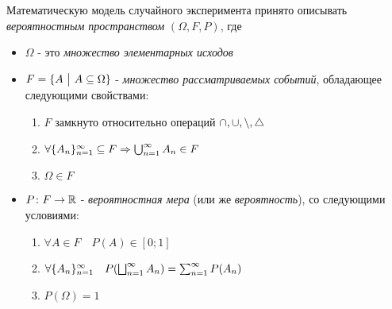 \begin{definition}
	Математическую модель случайного эксперимента принято описывать \textit{вероятностным пространством} $(\Omega, F, P)$, где
	\begin{itemize}
		\item $\Omega$ - это \textit{множество элементарных исходов}
		
		\item $F = \{A \ \big|\  A \subseteq \Omega\}$ - \textit{множество рассматриваемых событий}, обладающее следующими свойствами:
		\begin{enumerate}
			\item $F$ замкнуто относительно операций $\cap, \cup, \backslash, \triangle$
			
			\item $\forall \{A_n\}_{n = 1}^\infty \subseteq F \Rightarrow \bigcup_{n = 1}^\infty A_n \in F$
			
			\item $\Omega \in F$
		\end{enumerate}
		
		\item $P \colon F \to \mathbb{R}$ - \textit{вероятностная мера} (или же \textit{вероятность}), со следующими условиями:
		\begin{enumerate}
			\item $\forall A \in F \quad P(A) \in [0; 1]$
			
			\item $\forall \{A_n\}_{n = 1}^\infty \quad P(\bigsqcup_{n = 1}^\infty A_n) = \sum_{n = 1}^\infty P(A_n)$
			
			\item $P(\Omega) = 1$
		\end{enumerate}
	\end{itemize}
\end{definition}